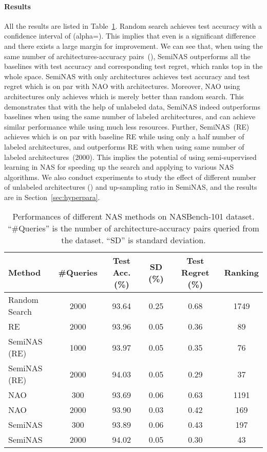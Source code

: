 \documentclass{article}
\begin{document}
\paragraph{Results}
All the results are listed in Table~\ref{tbl:nasbench}. Random search achieves  test accuracy with a confidence interval of  (alpha=). This implies that even  is a significant difference and there exists a large margin for improvement. We can see that, when using the same number of architectures-accuracy pairs~(), SemiNAS outperforms all the baselines with  test accuracy and corresponding  test regret, which ranks top  in the whole space. SemiNAS with only  architectures achieves  test accuracy and  test regret which is on par with NAO with  architectures. Moreover, NAO using  architectures only achieves  which is merely better than random search. This demonstrates that with the help of unlabeled data, SemiNAS indeed outperforms baselines when using the same number of labeled architectures, and can achieve similar performance while using much less resources. Further, SemiNAS~(RE) achieves  which is on par with baseline RE while using only a half number of labeled architectures, and outperforms RE with  when using same number of labeled architectures~(2000). This implies the potential of using semi-supervised learning in NAS for speeding up the search and applying to various NAS algorithms. We also conduct experiments to study the effect of different number of unlabeled architectures () and up-sampling ratio in SemiNAS, and the results are in Section~\ref{sec:hyperpara}.
\begin{table}[htbp]
\centering
\small
\begin{tabular}{lccccc}
\toprule
Method  & \#Queries & Test Acc. (\%) & SD (\%) & Test Regret (\%) & Ranking\\
\midrule
Random Search         & 2000 & 93.64 & 0.25 & 0.68 & 1749\\
\midrule
RE~\cite{amoebanet}   & 2000 & 93.96 & 0.05 & 0.36 & 89\\
SemiNAS (RE)          & 1000 & 93.97 & 0.05 & 0.35 & 76\\
SemiNAS (RE)          & 2000 & 94.03 & 0.05 & 0.29 & 37 \\
\midrule
NAO~\cite{nao}       & 300  & 93.69 & 0.06 & 0.63 & 1191\\
NAO~\cite{nao}        & 2000 & 93.90 & 0.03 & 0.42 & 169\\
SemiNAS               & 300  & 93.89 & 0.06 & 0.43 & 197\\
SemiNAS               & 2000 & 94.02 & 0.05 & 0.30 & 43\\
\bottomrule
\end{tabular}
\caption{Performances of different NAS methods on NASBench-101 dataset. ``\#Queries'' is the number of architecture-accuracy pairs queried from the dataset. ``SD'' is standard deviation.}
\label{tbl:nasbench}
\end{table}
\end{document}

